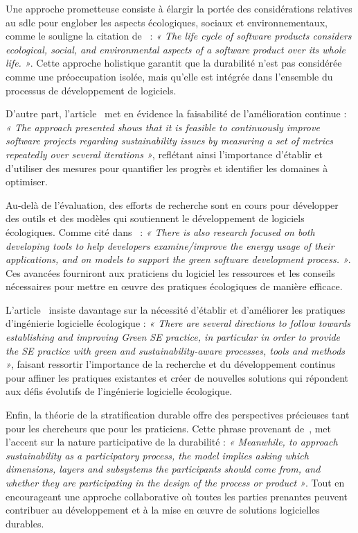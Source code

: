 Une approche prometteuse consiste à élargir la portée des considérations relatives au \acrshort{sdlc} pour englober les aspects écologiques, sociaux et environnementaux, comme le souligne la citation de~\cite{GreenAgileMethods} : \emph{« The life cycle of software products considers ecological, social, and environmental aspects of a software product over its whole life. »}. Cette approche holistique garantit que la durabilité n'est pas considérée comme une préoccupation isolée, mais qu'elle est intégrée dans l'ensemble du processus de développement de logiciels.


D'autre part, l'article~\cite{GreenAgileMethods} met en évidence la faisabilité de l'amélioration continue : \emph{« The approach presented shows that it is feasible to continuously improve software projects regarding sustainability issues by measuring a set of metrics repeatedly over several iterations »}, reflétant ainsi l'importance d'établir et d'utiliser des mesures pour quantifier les progrès et identifier les domaines à optimiser.


Au-delà de l'évaluation, des efforts de recherche sont en cours pour développer des outils et des modèles qui soutiennent le développement de logiciels écologiques. Comme cité dans~\cite{EmpiricalStudy} : \emph{« There is also research focused on both developing tools to help developers examine/improve the energy usage of their applications, and on models to support the green software development process. »}. Ces avancées fourniront aux praticiens du logiciel les ressources et les conseils nécessaires pour mettre en œuvre des pratiques écologiques de manière efficace.


L'article~\cite{GreenSustainableEngMapping} insiste davantage sur la nécessité d'établir et d'améliorer les pratiques d'ingénierie logicielle écologique : \emph{« There are several directions to follow towards establishing and improving Green SE practice, in particular in order to provide the SE practice with green and sustainability-aware processes, tools and methods »}, faisant ressortir l'importance de la recherche et du développement continus pour affiner les pratiques existantes et créer de nouvelles solutions qui répondent aux défis évolutifs de l'ingénierie logicielle écologique.


Enfin, la théorie de la stratification durable offre des perspectives précieuses tant pour les chercheurs que pour les praticiens. Cette phrase provenant de~\cite{SustainableStratifiedTheory}, met l'accent sur la nature participative de la durabilité : \emph{« Meanwhile, to approach sustainability as a participatory process, the model implies asking which dimensions, layers and subsystems the participants should come from, and whether they are participating in the design of the process or product »}. Tout en encourageant une approche collaborative où toutes les parties prenantes peuvent contribuer au développement et à la mise en œuvre de solutions logicielles durables.


